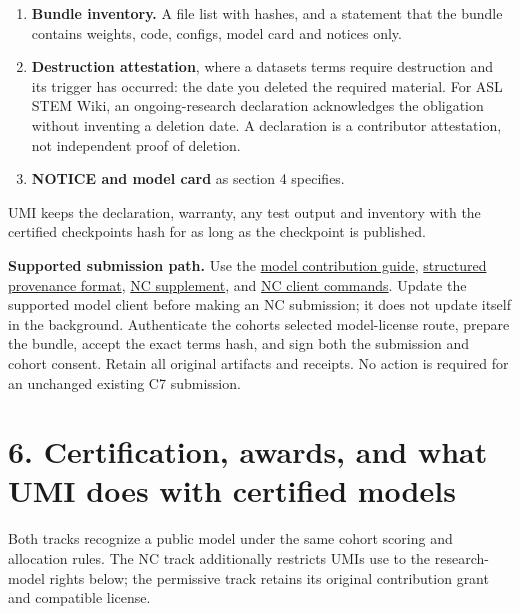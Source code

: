 \documentclass[10pt,a4paper]{article}
\begin{document}
\begin{enumerate}
\item
  \textbf{Bundle inventory.} A file list with hashes, and a statement
  that the bundle contains weights, code, configs, model card and
  notices only.
\item
  \textbf{Destruction attestation}, where a dataset\textquotesingle s
  terms require destruction and its trigger has occurred: the date you
  deleted the required material. For ASL STEM Wiki, an ongoing-research
  declaration acknowledges the obligation without inventing a deletion
  date. A declaration is a contributor attestation, not independent
  proof of deletion.
\item
  \textbf{NOTICE and model card} as section 4 specifies.
\end{enumerate}

UMI keeps the declaration, warranty, any test output and inventory with
the certified checkpoint\textquotesingle s hash for as long as the
checkpoint is published.

\textbf{Supported submission path.} Use the
\href{https://github.com/Umi-BitSign/umi/blob/main/docs/contributors/models.md}{model
contribution guide},
\href{https://github.com/Umi-BitSign/umi/blob/main/docs/reference/model-training-provenance.md}{structured
provenance format},
\href{https://github.com/Umi-BitSign/umi/blob/main/docs/MODEL_CONTRIBUTION_TERMS_NC_V2.md}{NC
supplement}, and
\href{https://github.com/Umi-BitSign/umi/blob/main/docs/reference/commands.md\#optional-non-commercial-model-terms}{NC
client commands}. Update the supported model client before making an NC
submission; it does not update itself in the background. Authenticate
the cohort\textquotesingle s selected model-license route, prepare the
bundle, accept the exact terms hash, and sign both the submission and
cohort consent. Retain all original artifacts and receipts. No action is
required for an unchanged existing C7 submission.

\section{6. Certification, awards, and what UMI does with certified
models}\label{6-certification-awards-and-what-umi-does-with-certified-models}

Both tracks recognize a public model under the same cohort scoring and
allocation rules. The NC track additionally restricts
UMI\textquotesingle s use to the research-model rights below; the
permissive track retains its original contribution grant and compatible
license.
\end{document}
